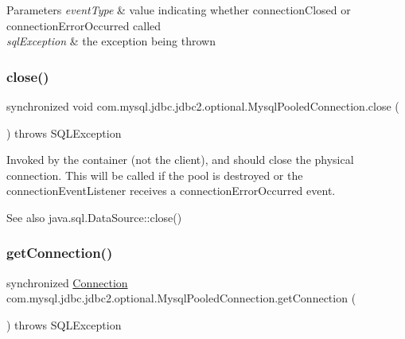 \begin{DoxyParams}{Parameters}
{\em event\+Type} & value indicating whether connection\+Closed or connection\+Error\+Occurred called \\
\hline
{\em sql\+Exception} & the exception being thrown \\
\hline
\end{DoxyParams}
\mbox{\label{classcom_1_1mysql_1_1jdbc_1_1jdbc2_1_1optional_1_1_mysql_pooled_connection_ab842c498acffec244987eaf732e3e753}} 
\subsubsection{\texorpdfstring{close()}{close()}}
{\footnotesize\ttfamily synchronized void com.\+mysql.\+jdbc.\+jdbc2.\+optional.\+Mysql\+Pooled\+Connection.\+close (\begin{DoxyParamCaption}{ }\end{DoxyParamCaption}) throws S\+Q\+L\+Exception}

Invoked by the container (not the client), and should close the physical connection. This will be called if the pool is destroyed or the connection\+Event\+Listener receives a connection\+Error\+Occurred event.

\begin{DoxySeeAlso}{See also}
java.\+sql.\+Data\+Source\+::close() 
\end{DoxySeeAlso}
\mbox{\label{classcom_1_1mysql_1_1jdbc_1_1jdbc2_1_1optional_1_1_mysql_pooled_connection_ac6c1ba2d95a0554270f8e7eba0e10c24}} 
\subsubsection{\texorpdfstring{get\+Connection()}{getConnection()}}
{\footnotesize\ttfamily synchronized \mbox{\hyperlink{interfacecom_1_1mysql_1_1jdbc_1_1_connection}{Connection}} com.\+mysql.\+jdbc.\+jdbc2.\+optional.\+Mysql\+Pooled\+Connection.\+get\+Connection (\begin{DoxyParamCaption}{ }\end{DoxyParamCaption}) throws S\+Q\+L\+Exception}

